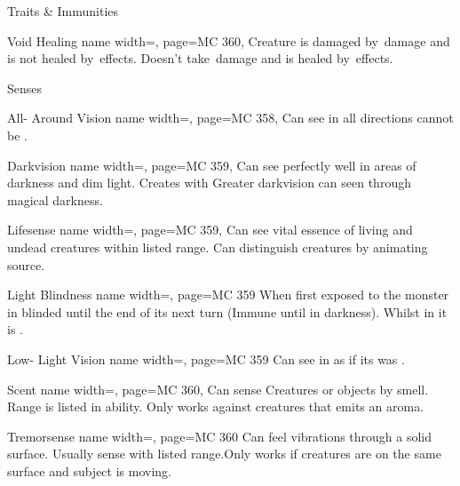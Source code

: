 \begin{PageFront}
\begin{Table}{Traits \& Immunities}
\begin{entry}{Void Healing}{%
            name width=\monsterLength,
            page=MC 360,%
        }
            Creature is damaged by \Vitality\,damage and is not healed by \Healing\Vitality\,effects. Doesn't take \Void\,damage and is healed by \Void\,effects.
        \end{entry}
    \end{Table}
    \begin{Table}{Senses}
        \begin{entry}{All-\! Around Vision}{%
            name width=\monsterLength,
            page=MC 358,%
        }
            Can see in all directions cannot be .
        \end{entry}
        \begin{entry}{Darkvision}{%
            name width=\monsterLength,
            page=MC 359,%
        }
            Can see perfectly well in areas of darkness and dim light. \hfill Creates with Greater darkvision can seen through magical darkness.
        \end{entry}
        \begin{entry}{Lifesense}{%
            name width=\monsterLength,
            page=MC 359,%
        }
            Can see vital essence of living and undead creatures within listed range. Can distinguish creatures by animating source.
        \end{entry}
        \begin{entry}{Light Blindness}{%
            name width=\monsterLength,
            page=MC 359%
        }
            When first exposed to  the monster in blinded until the end of its next turn (Immune until  in darkness).\hfill
            Whilst in  it is .
        \end{entry}
        \begin{entry}{Low-\! Light Vision}{%
            name width=\monsterLength,
            page=MC 359%
        }
            Can see in  as if its was .
        \end{entry}
        \begin{entry}{Scent}{%
            name width=\monsterLength,
            page=MC 360,%
        }
            Can sense Creatures or objects by smell. Range is listed in ability. Only works against creatures that emits an aroma.
        \end{entry}
        \begin{entry}{Tremorsense}{%
            name width=\monsterLength,
            page=MC 360%
        }
            Can feel vibrations through a solid surface. Usually  sense with listed range.\hfill Only works if creatures are on the same surface and subject is moving.

\end{entry}
\end{Table}
\end{PageFront}
